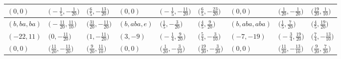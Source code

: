 \documentclass[10pt,a4paper]{amsart}
\theoremstyle{definition}
\numberwithin{equation}{section}
\begin{document}
\begin{landscape}
\begin{table}[th]
\begin{tabular}{|lll|lll|lll|}
\\
$(0, 0)$ & $\bigl(-\frac{1}{5}, -\frac{1}{20}\bigr)$ & $\bigl(\frac{6}{5}, -\frac{13}{20}\bigr)$ & $(0, 0)$ & $\bigl(-\frac{1}{5}, -\frac{11}{20}\bigr)$ & $\bigl(\frac{6}{5}, -\frac{23}{20}\bigr)$ & $(0, 0)$ & $\bigl(\frac{1}{20}, -\frac{1}{20}\bigr)$ & $\bigl(\frac{19}{20}, \frac{1}{10}\bigr)$
\\\hline
$(b, ba, ba)$ & $\bigl(-\frac{11}{20}, \frac{11}{10}\bigr)$ & $\bigl(\frac{31}{20}, -\frac{11}{20}\bigr)$ & $(b, aba, e)$ & $\bigl(\frac{1}{5}, -\frac{3}{20}\bigr)$ & $\bigl(\frac{4}{5}, \frac{9}{20}\bigr)$ & $(b, aba, aba)$ & $\bigl(\frac{1}{5}, \frac{7}{20}\bigr)$ & $\bigl(\frac{4}{5}, \frac{19}{20}\bigr)$
\\
$(-22, 11)$ & $\bigl(0, -\frac{11}{20}\bigr)$ & $\bigl(1, -\frac{11}{20}\bigr)$ & $(3, -9)$ & $\bigl(-\frac{1}{4}, \frac{9}{20}\bigr)$ & $\bigl(\frac{5}{4}, -\frac{3}{10}\bigr)$ & $(-7, -19)$ & $\bigl(-\frac{3}{4}, \frac{19}{20}\bigr)$ & $\bigl(\frac{7}{4}, -\frac{13}{10}\bigr)$
\\
$(0, 0)$ & $\bigl(\frac{11}{20}, -\frac{11}{20}\bigr)$ & $\bigl(\frac{9}{20}, \frac{11}{10}\bigr)$ & $(0, 0)$ & $\bigl(\frac{1}{20}, -\frac{3}{10}\bigr)$ & $\bigl(\frac{19}{20}, -\frac{3}{20}\bigr)$ & $(0, 0)$ & $\bigl(\frac{11}{20}, -\frac{13}{10}\bigr)$ & $\bigl(\frac{9}{20}, \frac{7}{20}\bigr)$
\\\hline
\end{tabular}
\end{table}


\end{landscape}
\end{document}
